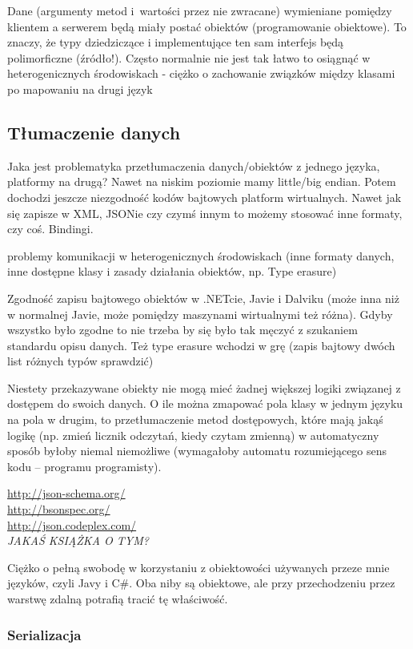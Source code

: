 Dane (argumenty metod i~wartości przez nie zwracane) wymieniane pomiędzy klientem a serwerem będą miały postać obiektów (programowanie obiektowe). To znaczy, że typy dziedziczące i implementujące ten sam interfejs będą polimorficzne (źródło!). Często normalnie nie jest tak łatwo to osiągnąć w heterogenicznych środowiskach - ciężko o zachowanie związków między klasami po mapowaniu na drugi język

\subsection{Tłumaczenie danych}
Jaka jest problematyka przetłumaczenia danych/obiektów z jednego języka, platformy na drugą?
Nawet na niskim poziomie mamy little/big endian. Potem dochodzi jeszcze niezgodność kodów bajtowych platform wirtualnych.
Nawet jak się zapisze w XML, JSONie czy czymś innym to możemy stosować inne formaty, czy coś. Bindingi.

problemy komunikacji w heterogenicznych środowiskach (inne formaty danych, inne dostępne klasy i zasady działania obiektów, np. Type erasure)

Zgodność zapisu bajtowego obiektów w .NETcie, Javie i Dalviku (może inna niż w normalnej Javie, może pomiędzy maszynami wirtualnymi też różna). Gdyby wszystko było zgodne to nie trzeba by się było tak męczyć z szukaniem standardu opisu danych. Też type erasure wchodzi w grę (zapis bajtowy dwóch list różnych typów sprawdzić)

Niestety przekazywane obiekty nie mogą mieć żadnej większej logiki związanej z dostępem do swoich danych. O ile można zmapować pola klasy w jednym języku na pola w drugim, to przetłumaczenie metod dostępowych, które mają jakąś logikę (np. zmień licznik odczytań, kiedy czytam zmienną) w automatyczny sposób byłoby niemal niemożliwe (wymagałoby automatu rozumiejącego sens kodu -- programu programisty).

\url{http://json-schema.org/}\\
\url{http://bsonspec.org/}\\
\url{http://json.codeplex.com/}\\

\emph{JAKAŚ KSIĄŻKA O TYM?}

Ciężko o pełną swobodę w korzystaniu z obiektowości używanych przeze mnie języków, czyli Javy i C\#. Oba niby są obiektowe, ale przy przechodzeniu przez warstwę zdalną potrafią tracić tę właściwość.

\subsubsection{Serializacja}

